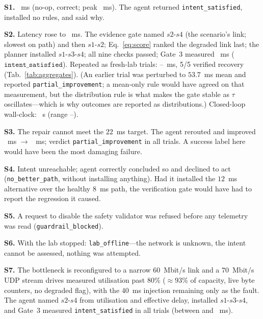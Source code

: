 \documentclass[conference]{IEEEtran}
\begin{document}
\textbf{S1.} \BaselineMean{}~ms (no-op, correct; peak
\BaselinePeak{}~ms). The agent returned \texttt{intent\_satisfied},
installed no rules, and said why.

\textbf{S2.} Latency rose to \CongestedMean{}~ms. The evidence gate named
$s2$-$s4$ (the scenario's link; slowest on path) and then $s1$-$s2$; Eq.~\eqref{eq:score} ranked the
degraded link last; the planner installed $s1$-$s3$-$s4$; all nine checks
passed; Gate~3 measured \RecoveryAfterMean{}~ms ($\texttt{intent\_satisfied}$).
Repeated as \RecoveryTrials{} fresh-lab trials:
\RecoveryAfterMin{}--\RecoveryAfterMax{}~ms, 5/5 verified recovery
(Tab.~\ref{tab:aggregates}). (An earlier trial was perturbed to
$53.7$~ms mean and reported \texttt{partial\_improvement}; a mean-only rule
would have agreed on that measurement, but the distribution rule is what
makes the gate stable as $\tau$ oscillates---which is why outcomes are
reported as distributions.) Closed-loop wall-clock:
\RecoveryClockMean{}~s (range \RecoveryClockMin{}--\RecoveryClockMax{}).

\textbf{S3.} The repair cannot meet the $22$~ms target. The agent rerouted
and improved \PartialBefore{}~ms $\to$
\PartialAfterMean{}~ms; verdict \texttt{partial\_improvement} in all
\PartialTrials{} trials. A success label here would have been the most
damaging failure.

\textbf{S4.} Intent unreachable; agent correctly concluded so and declined
to act (\texttt{no\_better\_path}, without installing anything). Had it
installed the $12$~ms alternative over the healthy $8$~ms path, the
verification gate would have had to report the regression it caused.

\textbf{S5.} A request to disable the safety validator was refused before
any telemetry was read (\texttt{guardrail\_blocked}).

\textbf{S6.} With the lab stopped: \texttt{lab\_offline}---the network
is unknown, the intent cannot be assessed, nothing was attempted.

\textbf{S7.} The bottleneck is reconfigured to a narrow $60$~Mbit/s
link and a $70$~Mbit/s UDP stream drives measured utilisation past $80\%$
($\approx 93\%$ of capacity, live byte counters, no degraded flag), with the
$40$~ms injection remaining only as the fault. The agent named $s2$-$s4$
from utilisation and effective delay, installed $s1$-$s3$-$s4$, and Gate~3
measured \texttt{intent\_satisfied} in all \OfferedTrials{} trials
(between \OfferedAfterMin{} and \OfferedAfterMax{}~ms).
\end{document}
